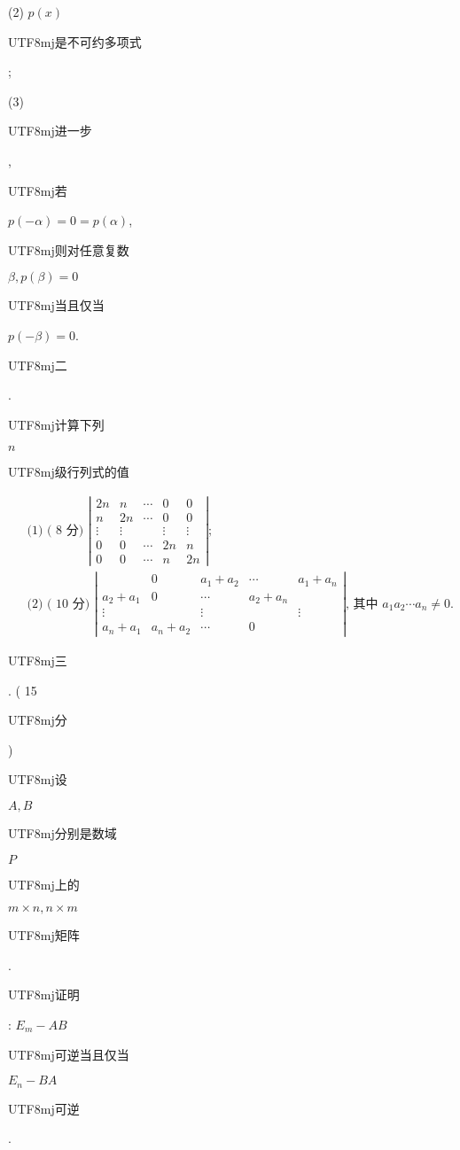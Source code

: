 \documentclass[10pt]{article}
\begin{document}
(2) $p(x)$ \begin{CJK}{UTF8}{mj}是不可约多项式\end{CJK};

(3) \begin{CJK}{UTF8}{mj}进一步\end{CJK}, \begin{CJK}{UTF8}{mj}若\end{CJK} $p(-\alpha)=0=p(\alpha)$, \begin{CJK}{UTF8}{mj}则对任意复数\end{CJK} $\beta, p(\beta)=0$ \begin{CJK}{UTF8}{mj}当且仅当\end{CJK} $p(-\beta)=0$.

\begin{CJK}{UTF8}{mj}二\end{CJK}. \begin{CJK}{UTF8}{mj}计算下列\end{CJK} $n$ \begin{CJK}{UTF8}{mj}级行列式的值\end{CJK}
$$
\begin{aligned}
&\text { (1) ( } 8 \text { 分) }\left|\begin{array}{ccccc}
2 n & n & \cdots & 0 & 0 \\
n & 2 n & \cdots & 0 & 0 \\
\vdots & \vdots & & \vdots & \vdots \\
0 & 0 & \cdots & 2 n & n \\
0 & 0 & \cdots & n & 2 n
\end{array}\right| ; \\
&\text { (2) ( } 10 \text { 分) }\left|\begin{array}{ccccc} 
& 0 & a_{1}+a_{2} & \cdots & a_{1}+a_{n} \\
a_{2}+a_{1} & 0 & \cdots & a_{2}+a_{n} \\
\vdots & & \vdots & & \vdots \\
a_{n}+a_{1} & a_{n}+a_{2} & \cdots & 0
\end{array}\right| \text {, 其中 } a_{1} a_{2} \cdots a_{n} \neq 0 .
\end{aligned}
$$
\begin{CJK}{UTF8}{mj}三\end{CJK}. ( 15 \begin{CJK}{UTF8}{mj}分\end{CJK}) \begin{CJK}{UTF8}{mj}设\end{CJK} $A, B$ \begin{CJK}{UTF8}{mj}分别是数域\end{CJK} $P$ \begin{CJK}{UTF8}{mj}上的\end{CJK} $m \times n, n \times m$ \begin{CJK}{UTF8}{mj}矩阵\end{CJK}. \begin{CJK}{UTF8}{mj}证明\end{CJK}: $E_{m}-A B$ \begin{CJK}{UTF8}{mj}可逆当且仅当\end{CJK} $E_{n}-B A$ \begin{CJK}{UTF8}{mj}可逆\end{CJK}.
\end{document}
